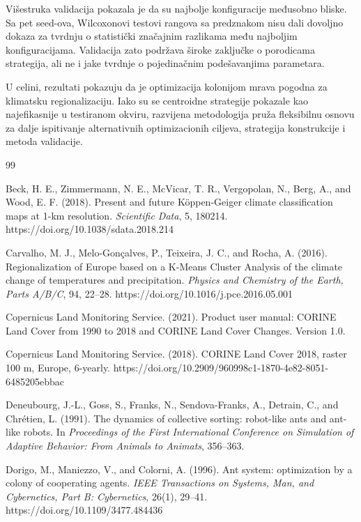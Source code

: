 \documentclass[11pt]{article}
\begin{document}
Višestruka validacija pokazala je da su najbolje konfiguracije međusobno bliske. Sa pet seed-ova, Wilcoxonovi testovi rangova sa predznakom nisu dali dovoljno dokaza za tvrdnju o statistički značajnim razlikama među najboljim konfiguracijama. Validacija zato podržava široke zaključke o porodicama strategija, ali ne i jake tvrdnje o pojedinačnim podešavanjima parametara.

U celini, rezultati pokazuju da je optimizacija kolonijom mrava pogodna za klimatsku regionalizaciju. Iako su se centroidne strategije pokazale kao najefikasnije u testiranom okviru, razvijena metodologija pruža fleksibilnu osnovu za dalje ispitivanje alternativnih optimizacionih ciljeva, strategija konstrukcije i metoda validacije.

\begin{thebibliography}{99}

Beck, H. E., Zimmermann, N. E., McVicar, T. R., Vergopolan, N., Berg, A., and Wood, E. F. (2018).
Present and future Köppen-Geiger climate classification maps at 1-km resolution.
\textit{Scientific Data}, 5, 180214.
https://doi.org/10.1038/sdata.2018.214

Carvalho, M. J., Melo-Gonçalves, P., Teixeira, J. C., and Rocha, A. (2016).
Regionalization of Europe based on a K-Means Cluster Analysis of the climate change of temperatures and precipitation.
\textit{Physics and Chemistry of the Earth, Parts A/B/C}, 94, 22--28.
https://doi.org/10.1016/j.pce.2016.05.001

Copernicus Land Monitoring Service. (2021).
Product user manual: CORINE Land Cover from 1990 to 2018 and CORINE Land Cover Changes.
Version 1.0.

Copernicus Land Monitoring Service. (2018).
CORINE Land Cover 2018, raster 100 m, Europe, 6-yearly.
https://doi.org/10.2909/960998c1-1870-4e82-8051-6485205ebbac

Deneubourg, J.-L., Goss, S., Franks, N., Sendova-Franks, A., Detrain, C., and Chrétien, L. (1991).
The dynamics of collective sorting: robot-like ants and ant-like robots.
In \textit{Proceedings of the First International Conference on Simulation of Adaptive Behavior: From Animals to Animats}, 356--363.

Dorigo, M., Maniezzo, V., and Colorni, A. (1996).
Ant system: optimization by a colony of cooperating agents.
\textit{IEEE Transactions on Systems, Man, and Cybernetics, Part B: Cybernetics}, 26(1), 29--41.
https://doi.org/10.1109/3477.484436


\end{thebibliography}
\end{document}
